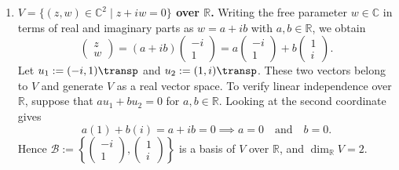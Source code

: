 \begin{exercisesolution*}
\begin{enumerate}[label=\textbf{(\alph*)}]
    \item \textbf{$V = \{(z, w) \in \mathbb{C}^2 \mid z + iw = 0\}$ over $\mathbb{R}$.} Writing the free parameter $w \in \mathbb{C}$ in terms of real and imaginary parts as $w = a + ib$ with $a, b \in \mathbb{R}$, we obtain
    \[
        \begin{pmatrix} z \\ w \end{pmatrix} = (a + ib) \begin{pmatrix} -i \\ 1 \end{pmatrix} = a \begin{pmatrix} -i \\ 1 \end{pmatrix} + b \begin{pmatrix} 1 \\ i \end{pmatrix}.
    \]
    Let $u_1 := (-i, 1)\transp$ and $u_2 := (1, i)\transp$. These two vectors belong to $V$ and generate $V$ as a real vector space. To verify linear independence over $\mathbb{R}$, suppose that $a u_1 + b u_2 = 0$ for $a, b \in \mathbb{R}$. Looking at the second coordinate gives
    \[
        a(1) + b(i) = a + ib = 0 \implies a = 0 \quad \text{and} \quad b = 0.
    \]
    Hence $\mathcal{B} := \left\{ \left(\begin{smallmatrix} -i \\ 1 \end{smallmatrix}\right), \left(\begin{smallmatrix} 1 \\ i \end{smallmatrix}\right) \right\}$ is a basis of $V$ over $\mathbb{R}$, and $\dim_{\mathbb{R}} V = 2$.
\end{enumerate}
\end{exercisesolution*}

